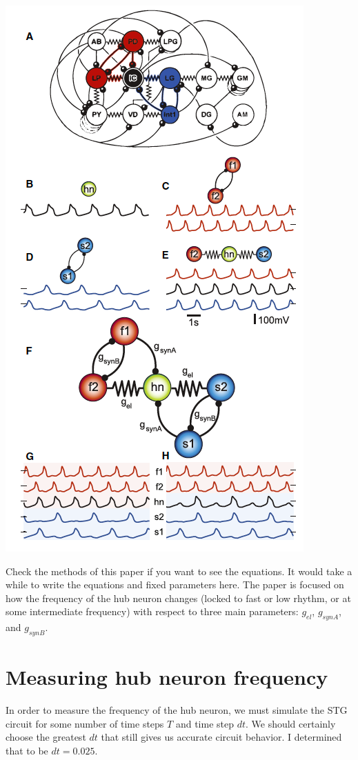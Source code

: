 \documentclass[11pt]{article}
\begin{document}
\begin{center}
\includegraphics[scale=0.3]{figs/Gutierrez2013_Fig1.png} \\
\end{center}

Check the methods of this paper if you want to see the equations.  It would take a while to write the equations and fixed parameters here.  The paper is focused on how the frequency of the hub neuron changes (locked to fast or low rhythm, or at some intermediate frequency) with respect to three main parameters: $g_{el}$, $g_{synA}$, and $g_{synB}$.

\section{Measuring hub neuron frequency}
In order to measure the frequency of the hub neuron, we must simulate the STG circuit for some number of time steps $T$ and time step $dt$.  We should certainly choose the greatest $dt$ that still gives us accurate circuit behavior.  I determined that to be $dt = 0.025$.  
\end{document}
